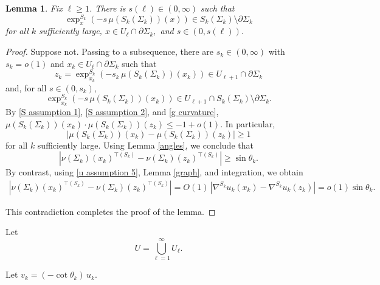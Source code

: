 \documentclass[11pt]{amsart}
\newtheorem{lem}[prop]{Lemma}
\begin{document}
\begin{lem} \label{non collapsing}
Fix $\ell \geq1$. There is $s(\ell)\in(0,\infty)$ 
 such that $$\exp^{S_k}_x(-s\,\mu(S_k(\Sigma_k))(x))\in  S_k(\Sigma_k)\setminus \partial \Sigma_k$$ for  all $k$ sufficiently large,   $x\in U_{\ell}\cap \partial \Sigma_k,$ and $s\in (0,s(\ell))$. 
\end{lem}
\begin{proof}
	Suppose not. Passing to a subsequence, there are  
	$s_k\in(0,\infty)$ with $s_k=o(1)$  and $x_k\in U_\ell\cap \partial \Sigma_k$ such that
	$$
	z_k=\exp^{S_k}_{x_k}(-s_k\,\mu(S_k(\Sigma_k))(x_k))\in U_{\ell+1}\cap \partial \Sigma_k 
	$$ and, for all $s\in(0,s_k)$,  $$\exp^{S_k}_{x_k}(-s\,\mu(S_k(\Sigma_k))(x_k))\in  U_{\ell+1}\cap S_k(\Sigma_k)\setminus \partial \Sigma_k.$$ 	
	 By \eqref{S assumption 1}, \eqref{S assumption 2}, and \eqref{g curvature},  
  $\mu(S_k(\Sigma_k))( x_k)\cdot \mu(S_k(\Sigma_k))(z_k)\leq-1+ o(1).$
	In particular, $$|\mu(S_k(\Sigma_k))( x_k)- \mu(S_k(\Sigma_k))(z_k)|\geq 1$$ for all $k$ sufficiently large. Using Lemma \ref{angles}, we conclude that
	$$|\nu( \Sigma_k)(x_k)^{\top(S_k)}-\nu(\Sigma_k)(z_k)^{\top(S_k)}|\geq \sin\theta_k.
	$$ 
	By contrast, using \eqref{u assumption 5},  
	Lemma \ref{graph}, and integration, we obtain
	\begin{align*} 
|\nu( \Sigma_k)(x_k)^{\top(S_k)}-\nu(\Sigma_k)(z_k)^{\top(S_k)}|=O(1)\,|\nabla^{S_k}u_k(x_k)-\nabla^{S_k}u_k(z_k)|=o(1)\sin\theta_k.
	\end{align*}
 
This contradiction completes the proof of the lemma.
\end{proof}

Let
$$
U=\bigcup_{\ell=1}^\infty U_\ell.
$$


Let $v_k=(-\cot\theta_k)\, u_k$.
\end{document}

